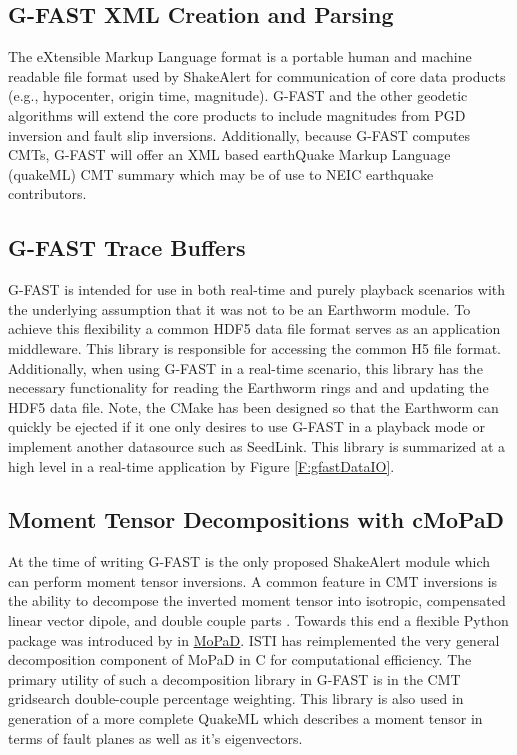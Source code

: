 \documentclass[12pt]{article}
\begin{document}
\subsection{G-FAST XML Creation and Parsing}\label{ss:gfastXML}
The eXtensible Markup Language format is a portable human and machine readable file format
used by ShakeAlert for communication of core data products (e.g., hypocenter, origin time, magnitude).  
G-FAST and the other geodetic algorithms will extend the core products to include magnitudes from
PGD inversion and fault slip inversions.  Additionally, because G-FAST computes CMTs, G-FAST
will offer an XML based earthQuake Markup Language (quakeML) CMT summary which may be of use to
NEIC earthquake contributors.  

\subsection{G-FAST Trace Buffers}\label{ss:gfastTraceBuffer}
G-FAST is intended for use in both real-time and purely playback scenarios with the underlying
assumption that it was not to be an Earthworm module.  To achieve this flexibility a common HDF5 
data file format serves as an application middleware.  This library is responsible for accessing
the common H5 file format.  Additionally, when using G-FAST in a real-time scenario, this library
has the necessary functionality for reading the Earthworm rings and and updating the HDF5 data file.
Note, the CMake has been designed so that the Earthworm can quickly be ejected if it one only 
desires to use G-FAST in a playback mode or implement another datasource such as SeedLink.   
This library is summarized at a high level in a real-time application by Figure \ref{F:gfastDataIO}.  

\subsection{Moment Tensor Decompositions with cMoPaD}\label{ss:gfastMopad}
At the time of writing G-FAST is the only proposed ShakeAlert module which can perform
moment tensor inversions.  A common feature in CMT inversions is the ability to decompose
the inverted moment tensor into isotropic, compensated linear vector dipole, and double
couple parts \citep[e.g.][]{jostAndHerrmann1989}.  Towards this end a flexible Python 
package was introduced by \citet{krieger} in \href{https://github.com/geophysics/MoPaD}{MoPaD}.  
ISTI has reimplemented the very general decomposition component of MoPaD in C for 
computational efficiency.  The primary utility of such a decomposition library in G-FAST is 
in the CMT gridsearch double-couple percentage weighting.  This library is also used in 
generation of a more complete QuakeML which describes a moment tensor in terms of fault planes 
as well as it's eigenvectors. 
\end{document}
